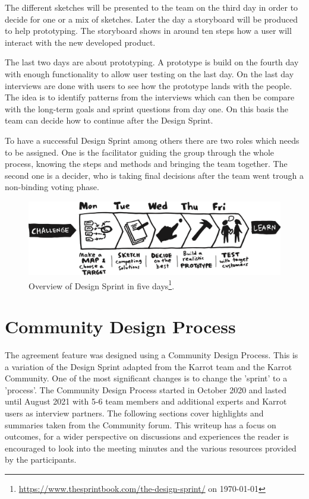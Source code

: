 \documentclass[
	a4paper,%
	11pt,%
	]{article}
\begin{document}
The different sketches will be presented to the team on the third day in order to decide for one or a mix of sketches. Later the day a storyboard will be produced to help prototyping. The storyboard shows in around ten steps how a user will interact with the new developed product.

The last two days are about prototyping. A prototype is build on the fourth day with enough functionality to allow user testing on the last day. On the last day interviews are done with users to see how the prototype lands with the people. The idea is to identify patterns from the interviews which can then be compare with the long-term goals and sprint questions from day one. On this basis the team can decide how to continue after the Design Sprint.

To have a successful Design Sprint among others there are two roles which needs to be assigned. One is the facilitator guiding the group through the whole process, knowing the steps and methods and bringing the team together. The second one is a decider, who is taking final decisions after the team went trough a non-binding voting phase.

\begin{figure}[ht]
	\includegraphics[width=\textwidth,
	]{images/sprint_process_overview.png}
	\caption[Overview of Design Sprint in five days]{Overview of Design Sprint in five days\footnote{\label{url:google_sprint_img}\url{https://www.thesprintbook.com/the-design-sprint/} on \today}.}
	\label{fig:design-sprint}
\end{figure}


\section{Community Design Process}

The agreement feature was designed using a Community Design Process. This is a variation of the Design Sprint adapted from the Karrot team and the Karrot Community. One of the most significant changes is to change the 'sprint' to a 'process'. The Community Design Process started in October 2020 and lasted until August 2021 with 5-6 team members and additional experts and Karrot users as interview partners. The following sections cover highlights and summaries taken from the Community forum. This writeup has a focus on outcomes, for a wider perspective on discussions and experiences the reader is encouraged to look into the meeting minutes and the various resources provided by the participants.
\end{document}
